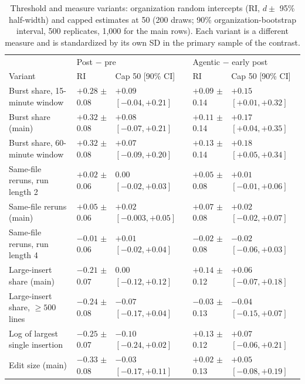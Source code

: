 \begin{table}[!htbp]
\caption{Threshold and measure variants: organization random intercepts (RI, $d \pm$ 95\% half-width) and capped estimates at 50 (200 draws; 90\% organization-bootstrap interval, 500 replicates, 1,000 for the main rows). Each variant is a different measure and is standardized by its own SD in the primary sample of the contrast.}
\label{tab:sens}
\scriptsize
\setlength{\tabcolsep}{3pt}
\begin{tabular}{@{}l l l l l@{}}
\toprule
 & \multicolumn{2}{l}{Post $-$ pre} & \multicolumn{2}{l}{Agentic $-$ early post} \\
Variant & RI & Cap 50 [90\% CI] & RI & Cap 50 [90\% CI] \\
\midrule
Burst share, 15-minute window & $+0.28$ $\pm$ 0.08 & $+0.09$ $[-0.04, +0.21]$ & $+0.09$ $\pm$ 0.14 & $+0.15$ $[+0.01, +0.32]$ \\
Burst share (main) & $+0.32$ $\pm$ 0.08 & $+0.08$ $[-0.07, +0.21]$ & $+0.11$ $\pm$ 0.14 & $+0.17$ $[+0.04, +0.35]$ \\
Burst share, 60-minute window & $+0.32$ $\pm$ 0.08 & $+0.07$ $[-0.09, +0.20]$ & $+0.13$ $\pm$ 0.14 & $+0.18$ $[+0.05, +0.34]$ \\
Same-file reruns, run length 2 & $+0.02$ $\pm$ 0.06 & $0.00$ $[-0.02, +0.03]$ & $+0.05$ $\pm$ 0.08 & $+0.01$ $[-0.01, +0.06]$ \\
Same-file reruns (main) & $+0.05$ $\pm$ 0.06 & $+0.02$ $[-0.003, +0.05]$ & $+0.07$ $\pm$ 0.08 & $+0.02$ $[-0.02, +0.07]$ \\
Same-file reruns, run length 4 & $-0.01$ $\pm$ 0.06 & $+0.01$ $[-0.02, +0.04]$ & $-0.02$ $\pm$ 0.08 & $-0.02$ $[-0.06, +0.03]$ \\
Large-insert share (main) & $-0.21$ $\pm$ 0.07 & $0.00$ $[-0.12, +0.12]$ & $+0.14$ $\pm$ 0.12 & $+0.06$ $[-0.07, +0.18]$ \\
Large-insert share, $\geq 500$ lines & $-0.24$ $\pm$ 0.08 & $-0.07$ $[-0.17, +0.04]$ & $-0.03$ $\pm$ 0.13 & $-0.04$ $[-0.15, +0.07]$ \\
Log of largest single insertion & $-0.25$ $\pm$ 0.07 & $-0.10$ $[-0.24, +0.02]$ & $+0.13$ $\pm$ 0.12 & $+0.07$ $[-0.06, +0.21]$ \\
Edit size (main) & $-0.33$ $\pm$ 0.08 & $-0.03$ $[-0.17, +0.11]$ & $+0.02$ $\pm$ 0.13 & $+0.05$ $[-0.08, +0.19]$ \\
\bottomrule
\end{tabular}
\end{table}
